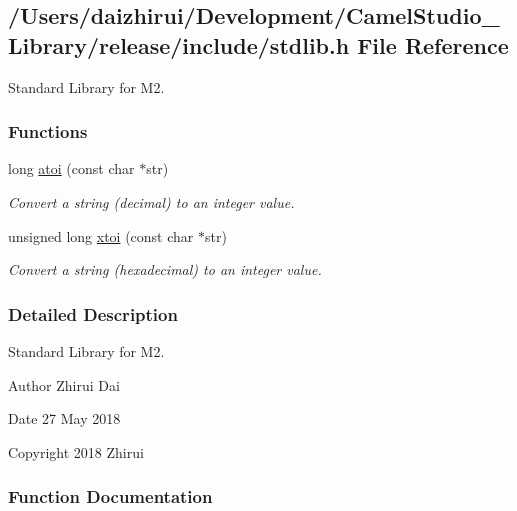 \hypertarget{a00032}{}\subsection{/\+Users/daizhirui/\+Development/\+Camel\+Studio\+\_\+\+Library/release/include/stdlib.h File Reference}
\label{a00032}


Standard Library for M2.  


\subsubsection*{Functions}
\begin{DoxyCompactItemize}
\item 
long \mbox{\hyperlink{a00032_a36f90d5de53f568b0fc5266ce013b9c5}{atoi}} (const char $\ast$str)
\begin{DoxyCompactList}\small\item\em Convert a string (decimal) to an integer value. \end{DoxyCompactList}\item 
unsigned long \mbox{\hyperlink{a00032_a9d6165da864d16ad50c13690c1e7d7ea}{xtoi}} (const char $\ast$str)
\begin{DoxyCompactList}\small\item\em Convert a string (hexadecimal) to an integer value. \end{DoxyCompactList}\end{DoxyCompactItemize}


\subsubsection{Detailed Description}
Standard Library for M2. 

\begin{DoxyAuthor}{Author}
Zhirui Dai 
\end{DoxyAuthor}
\begin{DoxyDate}{Date}
27 May 2018 
\end{DoxyDate}
\begin{DoxyCopyright}{Copyright}
2018 Zhirui 
\end{DoxyCopyright}


\subsubsection{Function Documentation}
\mbox{\label{a00032_a36f90d5de53f568b0fc5266ce013b9c5}} 
